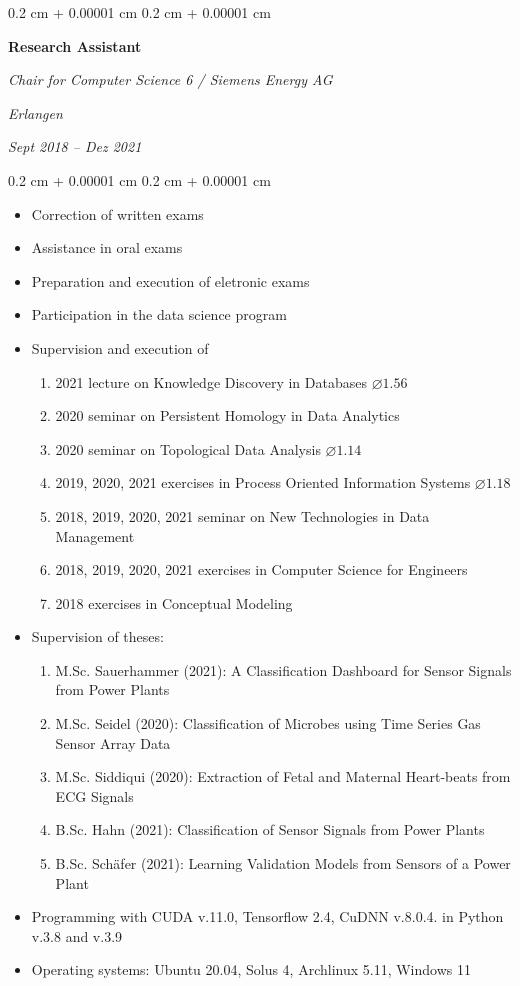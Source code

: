 \documentclass[10pt, letterpaper]{article}
\newenvironment{highlights}{
    \begin{itemize}[
        topsep=0.10 cm,
        parsep=0.10 cm,
        partopsep=0pt,
        itemsep=0pt,
        leftmargin=0.4 cm + 10pt
    ]
}{
    \end{itemize}
}
\newenvironment{onecolentry}{
    \begin{adjustwidth}{
        0.2 cm + 0.00001 cm
    }{
        0.2 cm + 0.00001 cm
    }
}{
    \end{adjustwidth}
}
\newenvironment{twocolentry}[2][]{
    \onecolentry
    \def\secondColumn{#2}
    \setcolumnwidth{\fill, 4.5 cm}
    \begin{paracol}{2}
}{
    \switchcolumn \raggedleft \secondColumn
    \end{paracol}
    \endonecolentry
}
\begin{document}
\begin{twocolentry}{
    \textit{Erlangen}    
    
    \textit{Sept 2018 – Dez 2021}}
    \textbf{Research Assistant}
    
    \textit{Chair for Computer Science 6 / Siemens Energy AG}
\end{twocolentry}

\vspace{0.10 cm}
\begin{onecolentry}
	\begin{highlights}
		\item Correction of written exams
        \item Assistance in oral exams
        \item Preparation and execution of eletronic exams
        \item Participation in the data science program
        \item Supervision and execution of
        \begin{enumerate}
            \item 2021 lecture on Knowledge Discovery in Databases $\varnothing 1.56$
            \item 2020 seminar on Persistent Homology in Data Analytics
            \item 2020 seminar on Topological Data Analysis $\varnothing 1.14$
            \item 2019, 2020, 2021 exercises in Process Oriented Information Systems $\varnothing 1.18$
            \item 2018, 2019, 2020, 2021 seminar on New Technologies in Data Management
            \item 2018, 2019, 2020, 2021 exercises in Computer Science for Engineers
            \item 2018 exercises in Conceptual Modeling
        \end{enumerate}
        \item Supervision of theses:
        \begin{enumerate}
            \item M.Sc. Sauerhammer (2021): A Classification Dashboard for Sensor Signals from Power Plants
            \item M.Sc. Seidel (2020): Classification of Microbes using Time Series Gas Sensor Array Data
            \item M.Sc. Siddiqui (2020): Extraction of Fetal and Maternal Heart-beats from ECG Signals
            \item B.Sc. Hahn (2021): Classification of Sensor Signals from Power Plants
            \item B.Sc. Schäfer (2021): Learning Validation Models from Sensors of a
Power Plant
        \end{enumerate}
        \item Programming with CUDA v.11.0, Tensorflow 2.4, CuDNN v.8.0.4. in Python v.3.8 and v.3.9
        \item Operating systems: Ubuntu 20.04, Solus 4, Archlinux 5.11, Windows 11
	\end{highlights}
\end{onecolentry}
\vspace{0.2 cm}
\end{document}
